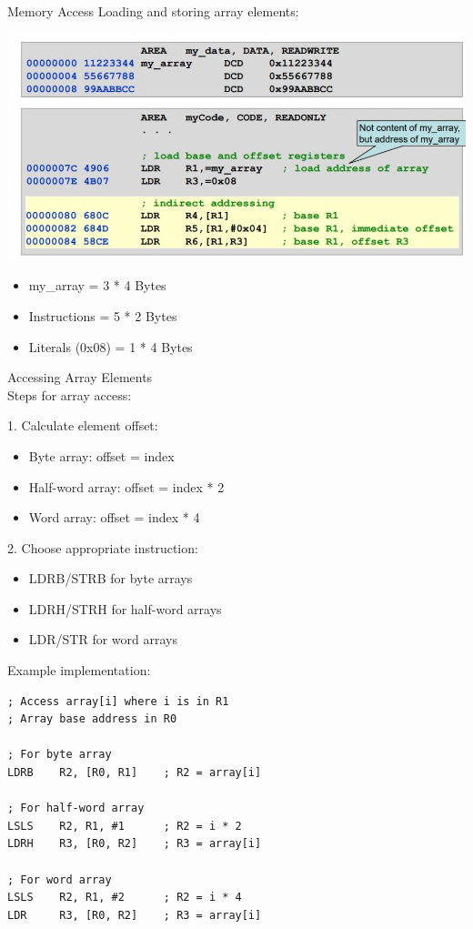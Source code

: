 \begin{concept}{Memory Access}
Loading and storing array elements:

\includegraphics[width=\linewidth]{images/2024_12_29_79e6b22f503fb7b4f718g-03(1)}

\begin{itemize}
  \item my\_array = 3 * 4 Bytes
  \item Instructions = 5 * 2 Bytes
  \item Literals (0x08) = 1 * 4 Bytes
\end{itemize}
\end{concept}

\begin{code}{Accessing Array Elements}\\
Steps for array access:

1. Calculate element offset:
   \begin{itemize}
     \item Byte array: offset = index
     \item Half-word array: offset = index * 2
     \item Word array: offset = index * 4
   \end{itemize}

2. Choose appropriate instruction:
   \begin{itemize}
     \item LDRB/STRB for byte arrays
     \item LDRH/STRH for half-word arrays
     \item LDR/STR for word arrays
   \end{itemize}

Example implementation:
\begin{lstlisting}[language=armasm, style=basesmol]
; Access array[i] where i is in R1
; Array base address in R0

; For byte array
LDRB    R2, [R0, R1]    ; R2 = array[i]

; For half-word array
LSLS    R2, R1, #1      ; R2 = i * 2
LDRH    R3, [R0, R2]    ; R3 = array[i]

; For word array
LSLS    R2, R1, #2      ; R2 = i * 4
LDR     R3, [R0, R2]    ; R3 = array[i]
\end{lstlisting}
\end{code}


